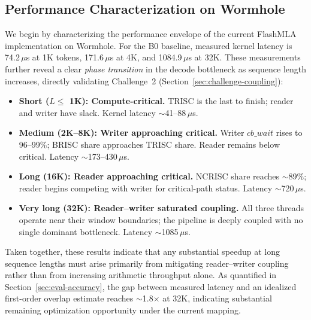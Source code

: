 \documentclass[sigconf, review, anonymous]{acmart}
\newcommand{\phaseTransition}{phase transition}
\begin{document}

\subsection{Performance Characterization on Wormhole}\label{sec:eval-profile}


We begin by characterizing the performance envelope of the current
FlashMLA implementation on Wormhole.  For the B0 baseline, measured
kernel latency is 74.2\,$\mu$s at 1K tokens, 171.6\,$\mu$s at 4K, and
1084.9\,$\mu$s at 32K.  These measurements further reveal a clear
\emph{\phaseTransition} in the decode bottleneck as sequence length
increases, directly validating Challenge~2
(Section~\ref{sec:challenge-coupling}):

\begin{itemize}
  \item \textbf{Short ($L \leq$ 1K): Compute-critical.}
    TRISC is the last to finish; reader and writer have slack.
    Kernel latency $\sim$41--88\,$\mu$s.

  \item \textbf{Medium (2K--8K): Writer approaching critical.}
    Writer $cb\_wait$ rises to 96--99\%; BRISC share approaches
    TRISC share.  Reader remains below critical.
    Latency $\sim$173--430\,$\mu$s.

  \item \textbf{Long (16K): Reader approaching critical.}
    NCRISC share reaches $\sim$89\%; reader begins competing
    with writer for critical-path status.
    Latency $\sim$720\,$\mu$s.

  \item \textbf{Very long (32K): Reader--writer saturated coupling.}
    All three threads operate near their window boundaries;
    the pipeline is deeply coupled with no single dominant bottleneck.
    Latency $\sim$1085\,$\mu$s.
\end{itemize}

Taken together, these results indicate that any substantial speedup at
long sequence lengths must arise primarily from mitigating
reader--writer coupling rather than from increasing arithmetic
throughput alone.  As quantified in Section~\ref{sec:eval-accuracy},
the gap between measured latency and an idealized first-order overlap
estimate reaches $\sim$1.8$\times$ at 32K, indicating substantial
remaining optimization opportunity under the current mapping.
\end{document}
